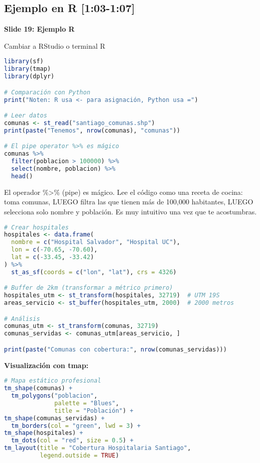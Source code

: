 \documentclass[11pt,a4paper]{article}
\newcommand{\tiempo}[1]{\textcolor{timecolor}{\faIcon{clock} \textbf{[#1]}}}
\newcommand{\decir}[1]{\begin{tcolorbox}[colback=blue!5,colframe=usachblue,title={\faIcon{microphone} DECIR}]#1\end{tcolorbox}}
\newcommand{\hacer}[1]{\begin{tcolorbox}[colback=green!5,colframe=green!50!black,title={\faIcon{hand-point-right} HACER}]#1\end{tcolorbox}}
\begin{document}
\subsection{Ejemplo en R \tiempo{1:03-1:07}}

\textbf{Slide 19: Ejemplo R}

\hacer{Cambiar a RStudio o terminal R}

\begin{lstlisting}[language=R, title=Código R equivalente]
library(sf)
library(tmap)
library(dplyr)

# Comparación con Python
print("Noten: R usa <- para asignación, Python usa =")

# Leer datos
comunas <- st_read("santiago_comunas.shp")
print(paste("Tenemos", nrow(comunas), "comunas"))

# El pipe operator %>% es mágico
comunas %>%
  filter(poblacion > 100000) %>%
  select(nombre, poblacion) %>%
  head()
\end{lstlisting}

\decir{El operador \%>\% (pipe) es mágico. Lee el código como una receta de cocina: toma comunas, LUEGO filtra las que tienen más de 100,000 habitantes, LUEGO selecciona solo nombre y población. Es muy intuitivo una vez que te acostumbras.}

\begin{lstlisting}[language=R, title=Crear el análisis]
# Crear hospitales
hospitales <- data.frame(
  nombre = c("Hospital Salvador", "Hospital UC"),
  lon = c(-70.65, -70.60),
  lat = c(-33.45, -33.42)
) %>%
  st_as_sf(coords = c("lon", "lat"), crs = 4326)

# Buffer de 2km (transformar a métrico primero)
hospitales_utm <- st_transform(hospitales, 32719)  # UTM 19S
areas_servicio <- st_buffer(hospitales_utm, 2000)  # 2000 metros

# Análisis
comunas_utm <- st_transform(comunas, 32719)
comunas_servidas <- comunas_utm[areas_servicio, ]

print(paste("Comunas con cobertura:", nrow(comunas_servidas)))
\end{lstlisting}

\textbf{Visualización con tmap:}

\begin{lstlisting}[language=R]
# Mapa estático profesional
tm_shape(comunas) +
  tm_polygons("poblacion", 
              palette = "Blues",
              title = "Población") +
tm_shape(comunas_servidas) +
  tm_borders(col = "green", lwd = 3) +
tm_shape(hospitales) +
  tm_dots(col = "red", size = 0.5) +
tm_layout(title = "Cobertura Hospitalaria Santiago",
          legend.outside = TRUE)
\end{lstlisting}
\end{document}
